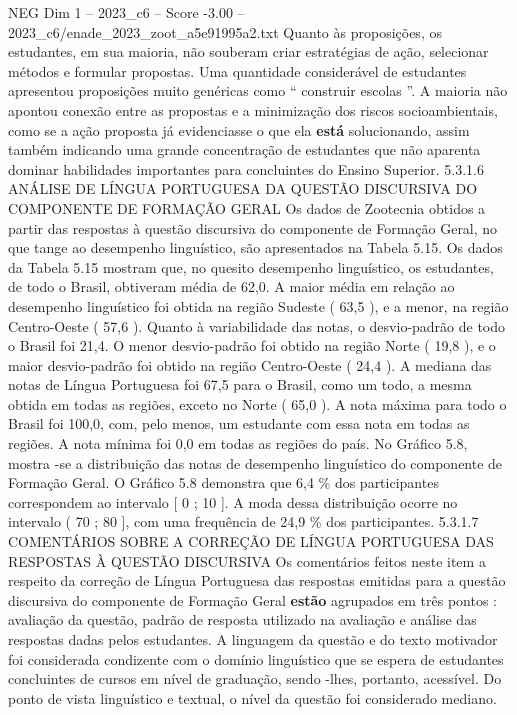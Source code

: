 \begin{textsample}{NEG Dim 1 – 2023\_c6 – Score -3.00 – 2023\_c6/enade\_2023\_zoot\_a5e91995a2.txt}
Quanto às proposições, os estudantes, em sua maioria, não souberam criar estratégias de ação, selecionar métodos e formular propostas.
Uma quantidade considerável de estudantes apresentou proposições muito genéricas como “ construir escolas ”.
A maioria não apontou conexão entre as propostas e a minimização dos riscos socioambientais, como se a ação proposta já evidenciasse o que ela \textbf{está} solucionando, assim também indicando uma grande concentração de estudantes que não aparenta dominar habilidades importantes para concluintes do Ensino Superior. 5.3.1.6 ANÁLISE DE LÍNGUA PORTUGUESA DA QUESTÃO DISCURSIVA DO COMPONENTE DE FORMAÇÃO GERAL Os dados de Zootecnia obtidos a partir das respostas à questão discursiva do componente de Formação Geral, no que tange ao desempenho linguístico, são apresentados na Tabela 5.15.
Os dados da Tabela 5.15 mostram que, no quesito desempenho linguístico, os estudantes, de todo o Brasil, obtiveram média de 62,0.
A maior média em relação ao desempenho linguístico foi obtida na região Sudeste ( 63,5 ), e a menor, na região Centro-Oeste ( 57,6 ).
Quanto à variabilidade das notas, o desvio-padrão de todo o Brasil foi 21,4.
O menor desvio-padrão foi obtido na região Norte ( 19,8 ), e o maior desvio-padrão foi obtido na região Centro-Oeste ( 24,4 ).
A mediana das notas de Língua Portuguesa foi 67,5 para o Brasil, como um todo, a mesma obtida em todas as regiões, exceto no Norte ( 65,0 ).
A nota máxima para todo o Brasil foi 100,0, com, pelo menos, um estudante com essa nota em todas as regiões.
A nota mínima foi 0,0 em todas as regiões do país.
No Gráfico 5.8, mostra -se a distribuição das notas de desempenho linguístico do componente de Formação Geral.
O Gráfico 5.8 demonstra que 6,4 \% dos participantes correspondem ao intervalo [ 0 ; 10 ].
A moda dessa distribuição ocorre no intervalo ( 70 ; 80 ], com uma frequência de 24,9 \% dos participantes. 5.3.1.7 COMENTÁRIOS SOBRE A CORREÇÃO DE LÍNGUA PORTUGUESA DAS RESPOSTAS À QUESTÃO DISCURSIVA Os comentários feitos neste item a respeito da correção de Língua Portuguesa das respostas emitidas para a questão discursiva do componente de Formação Geral \textbf{estão} agrupados em três pontos : avaliação da questão, padrão de resposta utilizado na avaliação e análise das respostas dadas pelos estudantes.
A linguagem da questão e do texto motivador foi considerada condizente com o domínio linguístico que se espera de estudantes concluintes de cursos em nível de graduação, sendo -lhes, portanto, acessível.
Do ponto de vista linguístico e textual, o nível da questão foi considerado mediano.

\end{textsample}
